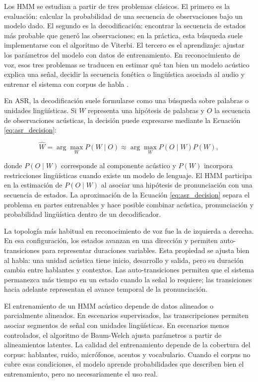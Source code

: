 Los HMM se estudian a partir de tres problemas clásicos. El primero es la evaluación: calcular la probabilidad de una secuencia de observaciones bajo un modelo dado. El segundo es la decodificación: encontrar la secuencia de estados más probable que generó las observaciones; en la práctica, esta búsqueda suele implementarse con el algoritmo de Viterbi. El tercero es el aprendizaje: ajustar los parámetros del modelo con datos de entrenamiento. En reconocimiento de voz, esos tres problemas se traducen en estimar qué tan bien un modelo acústico explica una señal, decidir la secuencia fonética o lingüística asociada al audio y entrenar el sistema con corpus de habla \cite{Rabiner1989TutoriHidden}.

En ASR, la decodificación suele formularse como una búsqueda sobre palabras o unidades lingüísticas. Si $W$ representa una hipótesis de palabras y $O$ la secuencia de observaciones acústicas, la decisión puede expresarse mediante la Ecuación \ref{eq:asr_decision}:

\begin{equation}
\hat{W}=\arg\max_W P(W \mid O) \approx \arg\max_W P(O \mid W)P(W),
\label{eq:asr_decision}
\end{equation}

donde $P(O \mid W)$ corresponde al componente acústico y $P(W)$ incorpora restricciones lingüísticas cuando existe un modelo de lenguaje. El HMM participa en la estimación de $P(O \mid W)$ al asociar una hipótesis de pronunciación con una secuencia de estados. La aproximación de la Ecuación \ref{eq:asr_decision} separa el problema en partes entrenables y hace posible combinar acústica, pronunciación y probabilidad lingüística dentro de un decodificador.

La topología más habitual en reconocimiento de voz fue la de izquierda a derecha. En esa configuración, los estados avanzan en una dirección y permiten auto-transiciones para representar duraciones variables. Esta propiedad se ajusta bien al habla: una unidad acústica tiene inicio, desarrollo y salida, pero su duración cambia entre hablantes y contextos. Las auto-transiciones permiten que el sistema permanezca más tiempo en un estado cuando la señal lo requiere; las transiciones hacia adelante representan el avance temporal de la pronunciación.

El entrenamiento de un HMM acústico depende de datos alineados o parcialmente alineados. En escenarios supervisados, las transcripciones permiten asociar segmentos de señal con unidades lingüísticas. En escenarios menos controlados, el algoritmo de Baum-Welch ajusta parámetros a partir de alineamientos latentes. La calidad del entrenamiento depende de la cobertura del corpus: hablantes, ruido, micrófonos, acentos y vocabulario. Cuando el corpus no cubre esas condiciones, el modelo aprende probabilidades que describen bien el entrenamiento, pero no necesariamente el uso real.


